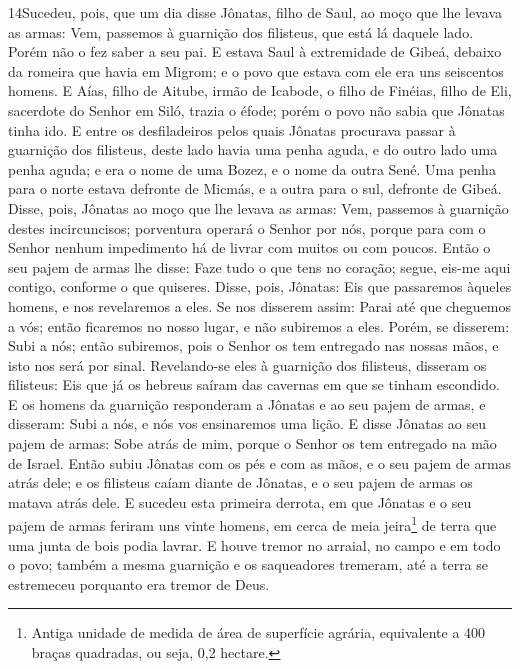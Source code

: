 \lettrine{14} Sucedeu, pois, que um dia disse Jônatas, filho
de Saul, ao moço que lhe levava as armas: Vem, passemos à guarnição
dos filisteus, que está lá daquele lado. Porém não o fez saber a seu
pai. E estava Saul à extremidade de Gibeá, debaixo da romeira
que havia em Migrom; e o povo que estava com ele era uns seiscentos
homens. E Aías, filho de Aitube, irmão de Icabode, o filho de
Finéias, filho de Eli, sacerdote do Senhor em Siló, trazia o éfode;
porém o povo não sabia que Jônatas tinha ido. E entre os
desfiladeiros pelos quais Jônatas procurava passar à guarnição dos
filisteus, deste lado havia uma penha aguda, e do outro lado uma
penha aguda; e era o nome de uma Bozez, e o nome da outra Sené.
Uma penha para o norte estava defronte de Micmás, e a outra para
o sul, defronte de Gibeá. Disse, pois, Jônatas ao moço que lhe
levava as armas: Vem, passemos à guarnição destes incircuncisos;
porventura operará o Senhor por nós, porque para com o Senhor nenhum
impedimento há de livrar com muitos ou com poucos. Então o seu
pajem de armas lhe disse: Faze tudo o que tens no coração; segue,
eis-me aqui contigo, conforme o que quiseres. Disse, pois,
Jônatas: Eis que passaremos àqueles homens, e nos revelaremos a
eles. Se nos disserem assim: Parai até que cheguemos a vós;
então ficaremos no nosso lugar, e não subiremos a eles.
Porém, se disserem: Subi a nós; então subiremos, pois o
Senhor os tem entregado nas nossas mãos, e isto nos será por sinal.
Revelando-se eles à guarnição dos filisteus, disseram os
filisteus: Eis que já os hebreus saíram das cavernas em que se
tinham escondido. E os homens da guarnição responderam a
Jônatas e ao seu pajem de armas, e disseram: Subi a nós, e nós vos
ensinaremos uma lição. E disse Jônatas ao seu pajem de armas: Sobe
atrás de mim, porque o Senhor os tem entregado na mão de Israel.
Então subiu Jônatas com os pés e com as mãos, e o seu pajem
de armas atrás dele; e os filisteus caíam diante de Jônatas, e o seu
pajem de armas os matava atrás dele. E sucedeu esta primeira
derrota, em que Jônatas e o seu pajem de armas feriram uns vinte
homens, em cerca de meia jeira\footnote{Antiga unidade de medida de
área de superfície agrária, equivalente a 400 braças quadradas, ou
seja, 0,2 hectare.} de terra que uma junta de bois podia lavrar.
E houve tremor no arraial, no campo e em todo o povo; também
a mesma guarnição e os saqueadores tremeram, até a terra se
estremeceu porquanto era tremor de Deus.

